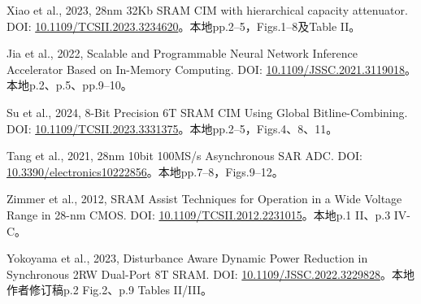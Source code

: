 \begingroup\small
\begin{description}[style=nextline,leftmargin=1em,labelwidth=0pt]
\item[\sid{SACIM-03}] Xiao et al., 2023, 28nm 32Kb SRAM CIM with hierarchical capacity attenuator. DOI: \href{https://doi.org/10.1109/TCSII.2023.3234620}{10.1109/TCSII.2023.3234620}。本地pp.2--5，Figs.1--8及Table II。
\item[\sid{SACIM-01}] Jia et al., 2022, Scalable and Programmable Neural Network Inference Accelerator Based on In-Memory Computing. DOI: \href{https://doi.org/10.1109/JSSC.2021.3119018}{10.1109/JSSC.2021.3119018}。本地p.2、p.5、pp.9--10。
\item[\sid{SACIM-05}] Su et al., 2024, 8-Bit Precision 6T SRAM CIM Using Global Bitline-Combining. DOI: \href{https://doi.org/10.1109/TCSII.2023.3331375}{10.1109/TCSII.2023.3331375}。本地pp.2--5，Figs.4、8、11。
\item[\sid{CMOS-02}] Tang et al., 2021, 28nm 10bit 100MS/s Asynchronous SAR ADC. DOI: \href{https://doi.org/10.3390/electronics10222856}{10.3390/electronics10222856}。本地pp.7--8，Figs.9--12。
\item[\sid{CMOS-03}] Zimmer et al., 2012, SRAM Assist Techniques for Operation in a Wide Voltage Range in 28-nm CMOS. DOI: \href{https://doi.org/10.1109/TCSII.2012.2231015}{10.1109/TCSII.2012.2231015}。本地p.1 II、p.3 IV-C。
\item[\sid{CMOS-07}] Yokoyama et al., 2023, Disturbance Aware Dynamic Power Reduction in Synchronous 2RW Dual-Port 8T SRAM. DOI: \href{https://doi.org/10.1109/JSSC.2022.3229828}{10.1109/JSSC.2022.3229828}。本地作者修订稿p.2 Fig.2、p.9 Tables II/III。
\end{description}
\endgroup
